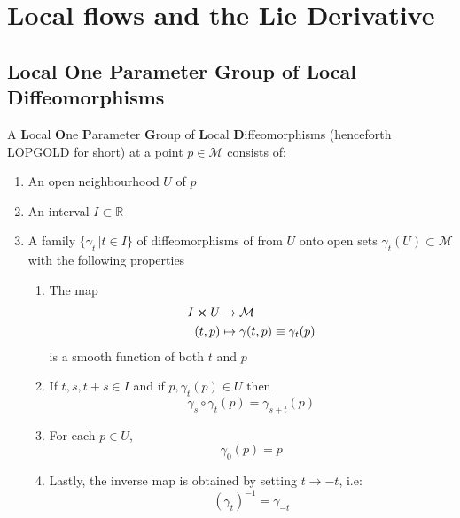\chapter{Local flows and the Lie Derivative}
  \section{Local One Parameter Group of Local Diffeomorphisms}
    \begin{definition}
      A \textbf{L}ocal \textbf{O}ne \textbf{P}arameter \textbf{G}roup of
      \textbf{L}ocal \textbf{D}iffeomorphisms (henceforth LOPGOLD for short)
      at a point $p \in \mathcal{M}$ consists of:
      \begin{enumerate}
        \item{An open neighbourhood $U$ of $p$}
        \item{An interval $I \subset \mathbb{R}$}
        \item{A family $\{\gamma_t \, |t\in I\}$ of diffeomorphisms of from
        $U$ onto open sets $\gamma_t(U) \subset \mathcal{M}$ with the following
        properties
        \begin{enumerate}
          \item{The map
            \begin{align*}
              I \cross U &\rightarrow \mathcal{M} \\
              (t,p) &\mapsto \gamma(t,p) \equiv \gamma_t(p)
            \end{align*}
            is a smooth function of both $t$ and $p$}
          \item{If $t,s,t+s \in I$ and if $p, \gamma_t(p) \in U$ then 
            \[\gamma_s \circ \gamma_t(p) = \gamma_{s+t}(p)\]}
          \item{For each $p \in U$, 
            \[\gamma_0(p) = p\]}
          \item{Lastly, the inverse map is obtained by setting $t \rightarrow
            -t$, i.e:
            \[(\gamma_t)^{-1} = \gamma_{-t}\]}
        \end{enumerate}}
      \end{enumerate}
    \end{definition}
